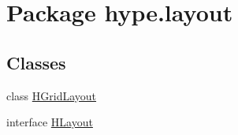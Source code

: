 \hypertarget{namespacehype_1_1layout}{\section{Package hype.\-layout}
\label{namespacehype_1_1layout}
}
\subsection*{Classes}
\begin{DoxyCompactItemize}
\item 
class \hyperlink{classhype_1_1layout_1_1_h_grid_layout}{H\-Grid\-Layout}
\item 
interface \hyperlink{interfacehype_1_1layout_1_1_h_layout}{H\-Layout}
\end{DoxyCompactItemize}
